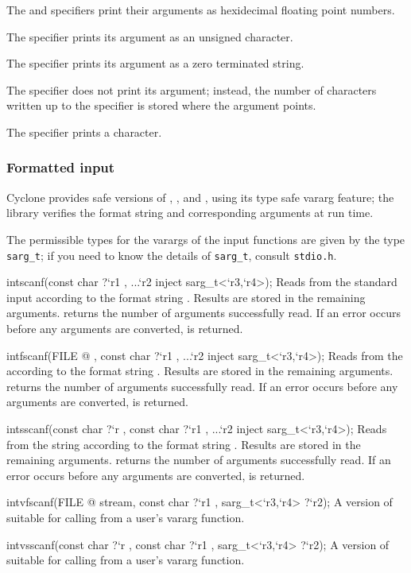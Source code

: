The  and  specifiers print their arguments as
hexidecimal floating point numbers.

The  specifier prints its argument as an unsigned character.

The  specifier prints its argument as a zero terminated string.

The  specifier does not print its argument; instead, the number
of characters written up to the  specifier is stored where the
argument points.

The \code{\%} specifier prints a \code{\%} character.


\subsubsection*{Formatted input}

Cyclone provides safe versions of , , and
, using its type safe vararg feature; the library
verifies the format string and corresponding arguments at run time.

The permissible types for the varargs of the input functions are given
by the type \texttt{sarg_t}; if you need to know the details of
\texttt{sarg_t}, consult \texttt{stdio.h}.

\begin{defun2}{int}{scanf}{(const char {?}`r1 , ...`r2 inject sarg_t<`r3,`r4>);}
  Reads from the standard input according to the format string
  .  Results are stored in the remaining arguments.
   returns the number of arguments successfully read.  If
  an error occurs before any arguments are converted,  is
  returned.
\end{defun2}
\begin{defun2}{int}{fscanf}{(FILE @ , const char {?}`r1 , ...`r2 inject sarg_t<`r3,`r4>);}
  Reads from the  according to the format string
  .  Results are stored in the remaining arguments.
   returns the number of arguments successfully read.  If
  an error occurs before any arguments are converted,  is
  returned.
\end{defun2}
\begin{defun2}{int}{sscanf}{(const char {?}`r , const char {?}`r1 , ...`r2 inject sarg_t<`r3,`r4>);}
  Reads from the string  according to the format string
  .  Results are stored in the remaining arguments.
   returns the number of arguments successfully read.  If
  an error occurs before any arguments are converted,  is
  returned.
\end{defun2}
\begin{defun2}{int}{vfscanf}{(FILE @ stream, const char {?}`r1 , sarg_t<`r3,`r4> {?}`r2);}
  A version of  suitable for calling from a user's
  vararg function.
\end{defun2}
\begin{defun2}{int}{vsscanf}{(const char {?}`r , const char {?}`r1 , sarg_t<`r3,`r4> {?}`r2);}
  A version of  suitable for calling from a user's
  vararg function.
\end{defun2}

